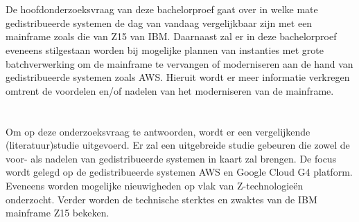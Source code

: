 \section{}
\label{sec:onderzoeksvraag}

De hoofdonderzoeksvraag van deze bachelorproef gaat over in welke mate gedistribueerde systemen de dag van vandaag vergelijkbaar zijn met een mainframe zoals die van Z15 van IBM. Daarnaast zal er in deze bachelorproef eveneens stilgestaan worden bij mogelijke plannen van instanties met grote batchverwerking om de mainframe te vervangen of moderniseren aan de hand van gedistribueerde systemen zoals AWS. Hieruit wordt er meer informatie verkregen omtrent de voordelen en/of nadelen van het moderniseren van de mainframe. 

\section{}
\label{sec:onderzoeksdoelstelling}

\subsection{}

Om op deze onderzoeksvraag te antwoorden, wordt er een vergelijkende (literatuur)studie uitgevoerd. Er zal een uitgebreide studie gebeuren die zowel de voor- als nadelen van gedistribueerde systemen in kaart zal brengen. De focus wordt gelegd op de gedistribueerde systemen AWS en Google Cloud G4 platform. Eveneens worden mogelijke nieuwigheden op vlak van Z-technologieën onderzocht. Verder worden de technische sterktes en zwaktes van de IBM mainframe Z15 bekeken.

\subsection{}

